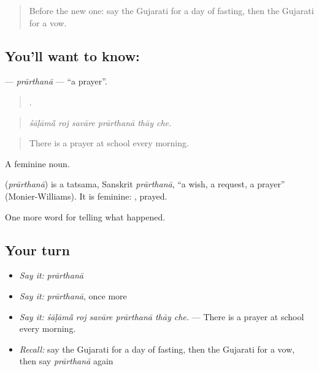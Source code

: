 \label{lesson:GU-C331-prarthana}



\begin{quote}
Before the new one: say the Gujarati for a day of fasting, then the Gujarati for a vow.
\end{quote}

\subsection*{You'll want to know: }
\textbf{} — \emph{prārthanā} — \textquotedblleft{}a prayer\textquotedblright{}.

\begin{quote}
     .
\end{quote}

\begin{quote}
\emph{śāḷāmā̃ roj savāre prārthanā thāy che.}
\end{quote}

\begin{quote}
There is a prayer at school every morning.
\end{quote}

A feminine noun.

\begin{cousinweb}
\textbf{} (\emph{prārthanā}) is a tatsama, Sanskrit \emph{prārthanā}, \textquotedblleft{}a wish, a request, a prayer\textquotedblright{} (Monier-Williams). It is feminine: \textbf{ }, prayed.
\end{cousinweb}

\begin{grammarlens}[title={What you've built}]
One more word for telling what happened.
\end{grammarlens}

\subsection*{Your turn}
\begin{itemize}
\raggedright
  \item \emph{Say it:} \emph{prārthanā}
  \item \emph{Say it:} \emph{prārthanā}, once more
  \item \emph{Say it:} \emph{śāḷāmā̃ roj savāre prārthanā thāy che.} — There is a prayer at school every morning.
  \item \emph{Recall:} say the Gujarati for a day of fasting, then the Gujarati for a vow, then say \emph{prārthanā} again
\end{itemize}

